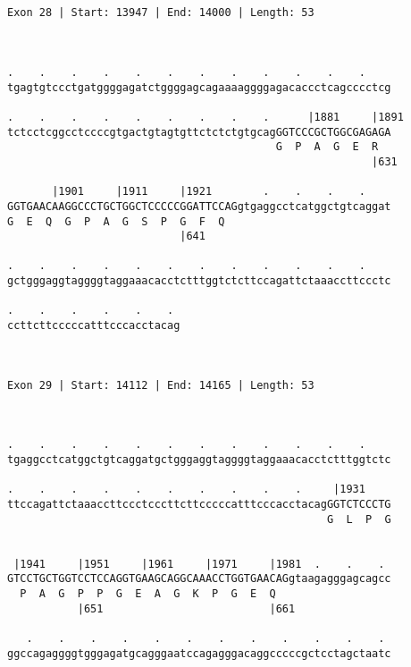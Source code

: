 \documentclass{article}
\begin{document}
\begin{Verbatim}
                                                           
 
Exon 28 | Start: 13947 | End: 14000 | Length: 53



.    .    .    .    .    .    .    .    .    .    .    .    
tgagtgtccctgatggggagatctggggagcagaaaaggggagacaccctcagcccctcg
                                                            
.    .    .    .    .    .    .    .    .      |1881     |1891
tctcctcggcctccccgtgactgtagtgttctctctgtgcagGGTCCCGCTGGCGAGAGA
                                          G  P  A  G  E  R  
                                                         |631
  
       |1901     |1911     |1921        .    .    .    .    
GGTGAACAAGGCCCTGCTGGCTCCCCCGGATTCCAGgtgaggcctcatggctgtcaggat
G  E  Q  G  P  A  G  S  P  G  F  Q                          
                           |641                             
  
.    .    .    .    .    .    .    .    .    .    .    .    
gctgggaggtaggggtaggaaacacctctttggtctcttccagattctaaaccttccctc
                                                            
.    .    .    .    .    . 
ccttcttcccccatttcccacctacag
                           
                           
 
Exon 29 | Start: 14112 | End: 14165 | Length: 53



.    .    .    .    .    .    .    .    .    .    .    .    
tgaggcctcatggctgtcaggatgctgggaggtaggggtaggaaacacctctttggtctc
                                                            
.    .    .    .    .    .    .    .    .    .     |1931    
ttccagattctaaaccttccctcccttcttcccccatttcccacctacagGGTCTCCCTG
                                                  G  L  P  G
                                                            
  
 |1941     |1951     |1961     |1971     |1981  .    .    . 
GTCCTGCTGGTCCTCCAGGTGAAGCAGGCAAACCTGGTGAACAGgtaagagggagcagcc
  P  A  G  P  P  G  E  A  G  K  P  G  E  Q                  
           |651                          |661               
  
   .    .    .    .    .    .    .    .    .    .    .    . 
ggccagaggggtgggagatgcagggaatccagagggacaggcccccgctcctagctaatc
                                                            

\end{Verbatim}
\end{document}
